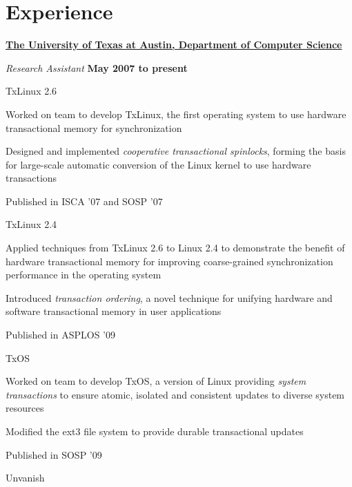 \section{Experience}
\href{http://www.cs.utexas.edu}{\textbf{The University of Texas at Austin,
Department of Computer Science}}
\begin{outerlist}

\item[] \textit{Research Assistant}%
    \hfill \textbf{May 2007 to present}
    \begin{innerlist}
        \item TxLinux 2.6 
        \begin{innerlist}
           \item Worked on team to develop TxLinux, the first operating system
to use hardware transactional memory for synchronization
           \item Designed and implemented \emph{cooperative transactional
spinlocks}, forming the basis for large-scale automatic conversion of the
Linux kernel to use hardware transactions
           \item Published in ISCA '07 and SOSP '07
        \end{innerlist}
        \item TxLinux 2.4
        \begin{innerlist}
           \item Applied techniques from TxLinux 2.6 to Linux 2.4 to
demonstrate the benefit of hardware transactional memory for
improving coarse-grained synchronization performance in the operating
system
           \item Introduced \emph{transaction ordering}, a novel technique for
unifying hardware and software transactional memory in user applications
           \item Published in ASPLOS '09
        \end{innerlist}
        \item TxOS
        \begin{innerlist}
           \item Worked on team to develop TxOS, a version of Linux
providing \emph{system transactions} to ensure atomic, isolated and
consistent updates to diverse system resources
           \item Modified the ext3 file system to provide durable
transactional updates
           \item Published in SOSP '09
        \end{innerlist}
        \item Unvanish

\end{innerlist}
\end{outerlist}
